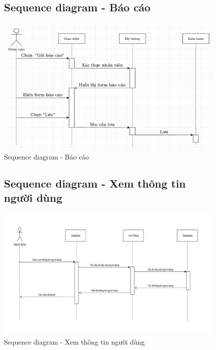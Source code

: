 \documentclass{report}
\begin{document}
\begin{center}
	\begin{figure}[!htp]
		\subsection{Sequence diagram - Báo cáo}
		\begin{center}
			\includegraphics[scale=.8]{Hinh/Sequence diagram Báo cáo.png}
		\end{center}
		\caption{Sequence diagram - Báo cáo}
	\end{figure}
\end{center}

\begin{center}
	\begin{figure}[!htp]
		\subsection{Sequence diagram - Xem thông tin người dùng}
		\begin{center}
			\includegraphics[scale=1]{Hinh/Sequence diagram Xem thông tin người dùng.png}
		\end{center}
		\caption{Sequence diagram - Xem thông tin người dùng}
	\end{figure}
\end{center}
\end{document}
